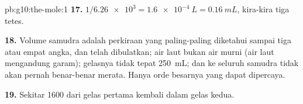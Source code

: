 \begin{solution}{pb:g10:the-mole:1}
\textbf{17.} $1 / \num{6.26e3} = \qty{1.6e-4}{L} = \qty{0.16}{mL}$,
kira-kira tiga tetes.

\textbf{18.} Volume samudra adalah perkiraan yang paling-paling
diketahui sampai tiga atau empat angka, dan telah dibulatkan; air laut
bukan air murni (air laut mengandung garam); gelasnya tidak tepat
\qty{250}{mL}; dan  ke seluruh samudra tidak akan pernah
benar-benar merata. Hanya orde besarnya yang dapat dipercaya.

\textbf{19.} Sekitar 1600  dari gelas pertama kembali dalam gelas
kedua.
\end{solution}
